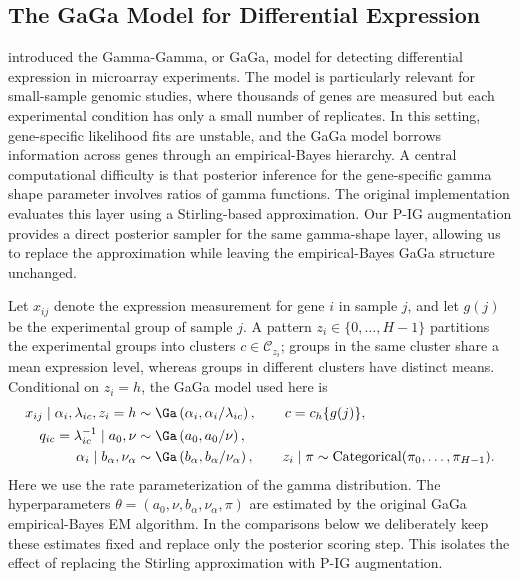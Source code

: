 \subsection{The GaGa Model for Differential Expression}
\label{sec:gaga-pig}

\cite{Rossell2009GaGa} introduced the Gamma-Gamma, or GaGa, model for
detecting differential expression in microarray experiments.  The model is
particularly relevant for small-sample genomic studies, where thousands of
genes are measured but each experimental condition has only a small number of
replicates.  In this setting, gene-specific likelihood fits are unstable, and
the GaGa model borrows information across genes through an empirical-Bayes
hierarchy.  A central computational difficulty is that posterior inference for
the gene-specific gamma shape parameter involves ratios of gamma functions.
The original implementation evaluates this layer using a Stirling-based
approximation.  Our P-IG augmentation provides a direct posterior sampler for
the same gamma-shape layer, allowing us to replace the approximation while
leaving the empirical-Bayes GaGa structure unchanged.

Let $x_{ij}$ denote the expression measurement for gene $i$ in sample $j$, and
let $g(j)$ be the experimental group of sample $j$.  A pattern
$z_i \in \{0,\ldots,H-1\}$ partitions the experimental groups into clusters
$c \in \mathcal{C}_{z_i}$; groups in the same cluster share a mean expression
level, whereas groups in different clusters have distinct means.  Conditional
on $z_i=h$, the GaGa model used here is
\begin{align}
x_{ij}\mid \alpha_i,\lambda_{ic}, z_i=h
  &\sim \Ga\left(\alpha_i,\alpha_i/\lambda_{ic}\right),
  \qquad c=c_h\{g(j)\},
  \label{eq:gaga-likelihood}
\\
q_{ic}=\lambda_{ic}^{-1}\mid a_0,\nu
  &\sim \Ga\left(a_0,a_0/\nu\right),
  \label{eq:gaga-lambda-prior}
\\
\alpha_i\mid b_\alpha,\nu_\alpha
  &\sim \Ga\left(b_\alpha,b_\alpha/\nu_\alpha\right),
  \qquad
z_i\mid \pi \sim \mathrm{Categorical}(\pi_0,\ldots,\pi_{H-1}).
  \label{eq:gaga-alpha-prior}
\end{align}
Here we use the rate parameterization of the gamma distribution.  The
hyperparameters
$\theta=(a_0,\nu,b_\alpha,\nu_\alpha,\pi)$ are estimated by the original GaGa
empirical-Bayes EM algorithm.  In the comparisons below we deliberately keep
these estimates fixed and replace only the posterior scoring step.  This
isolates the effect of replacing the Stirling approximation with P-IG
augmentation.

